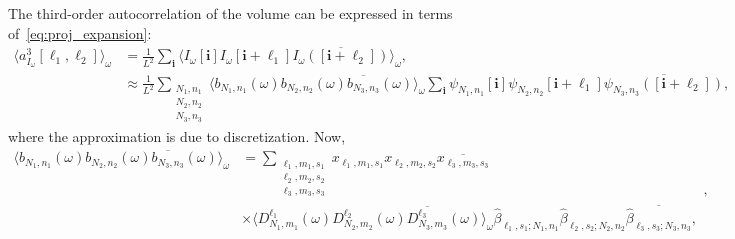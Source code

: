 \documentclass[12pt]{article}
\newcommand{\1}{\mathbf{1}}
\newcommand{\mb}{\mathbf}
\newcommand*\Bell{\ensuremath{\boldsymbol\ell}}
\newcommand{\tamir}{x}
\theoremstyle{plain}
\theoremstyle{definition}
\theoremstyle{remark}
\theoremstyle{plain}
\theoremstyle{remark}
\theoremstyle{plain}
\theoremstyle{plain}
\begin{document}
The third-order autocorrelation of the volume can be expressed in terms of~\eqref{eq:proj_expansion}:
\begin{align} \label{eq:third_order_ac_volume}
\langle
a^3_{I_{\omega}}[\Bell_1, \Bell_2]\rangle_{\omega} &= \frac{1}{L^2}\sum_{\mb i}\langle I_{\omega}[\mb i]I_{\omega}[\mb i+\Bell_1]\overline{I_{\omega}([\mb i+\Bell_2])}\rangle_{\omega},\\
&\approx \frac{1}{L^2}\sum_{\substack{N_1,n_1\\N_2,n_2\\N_3,n_3}} \langle b_{N_1,n_1}(\omega)b_{N_2,n_2}(\omega)\overline{b_{N_3,n_3}}(\omega)\rangle_{\omega} \sum_{\mb i}\psi_{N_1,n_1}[\mb i]\psi_{N_2,n_2}[\mb i+\Bell_1]\overline{\psi_{N_3,n_3}([\mb i+\Bell_2])},\nonumber
\end{align}
where the approximation is due to discretization. 
Now,
\[\begin{aligned} \langle b_{N_1,n_1}(\omega)b_{N_2,n_2}(\omega)\overline{b_{N_3,n_3}}(\omega)\rangle_{\omega} &= \sum_{\substack{\ell_1,m_1,s_1\\\ell_2,m_2,s_2\\\ell_3,m_3,s_3}}\tamir_{\ell_1,m_1,s_1}\tamir_{\ell_2,m_2,s_2}\overline{\tamir_{\ell_3,m_3,s_3}}\\&\times \langle D_{N_1,m_1}^{\ell_1}(\omega)D_{N_2,m_2}^{\ell_2}(\omega)\overline{D_{N_3,m_3}^{\ell_3}}(\omega)\rangle_{\omega} \widehat\beta_{\ell_1,s_1;N_1,n_1}\widehat\beta_{\ell_2,s_2;N_2,n_2}\overline{\widehat\beta_{\ell_3,s_3;N_3,n_3}},\end{aligned},\]
\end{document}
